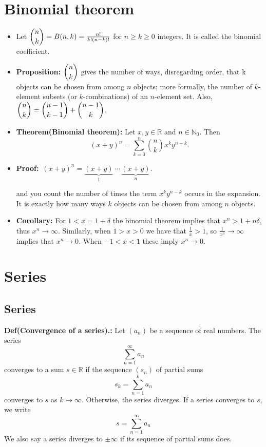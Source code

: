 \documentclass{article}
\begin{document}
\section{Binomial theorem}
\begin{itemize}
    \item Let $\dbinom{n}{k} = B(n,k) = \frac{n!}{k!(n-k)!}$ for $n \geq k \geq 0$ integers. It is called the binomial coefficient.
    \item \textbf{Proposition:} $\dbinom{n}{k}$ gives the number of ways, disregarding order, that k objects can be chosen from among $n$ objects; more formally, the number of $k$-element subsets (or $k$-combinations) of an $n$-element set. Also, $\dbinom{n}{k} = \dbinom{n-1}{k-1} + \dbinom{n-1}{k}$.
    \item \textbf{Theorem(Binomial theorem):} Let $x, y \in \mathbb{R}$ and $n \in \mathbb{N}_0$. Then 
    \[
    (x+y)^n = \sum_{k=0}^{n} \binom{n}{k} x^k y^{n-k}.
    \]
    \item \textbf{Proof:}~$(x+y)^n = \underbrace{(x+y)}_{1}\,\cdots\,\underbrace{(x+y)}_{n}.$

    and you count the number of times the term $x^k y^{n-k}$ occurs in the expansion. It is exactly how many ways $k$ objects can be chosen from among $n$ objects.
    \item \textbf{Corollary:} For $1 < x = 1 + \delta$ the binomial theorem implies that $x^n > 1 + n\delta$, thus $x^n \to \infty$. Similarly, when $1 > x > 0$ we have that $\frac{1}{x} > 1$, so $\frac{1}{x^n} \to \infty$ implies that $x^n \to 0$. When $-1 < x < 1$ these imply $x^n \to 0$.
\end{itemize}


\section{Series}
\subsection{Series}

\textbf{Def(Convergence of a series).:} Let $(a_n)$ be a sequence of real numbers. The series
\[
\sum^{\infty}_{n=1}{a_n}
\]
converges to a sum $s\in \mathbb{R}$ if the sequence $(s_n)$ of partial sums
\[
s_k=\sum_{n=1}^{k}{a_n}
\]
converges to $s$ as $k\mapsto \infty$. Otherwise, the series diverges. If a series 
converges to $s$, we write 
\[
s=\sum_{n=1}^{\infty}{a_n}
\]
We also say a series diverges to $\pm \infty$ if its sequence of partial sums does.
\end{document}
